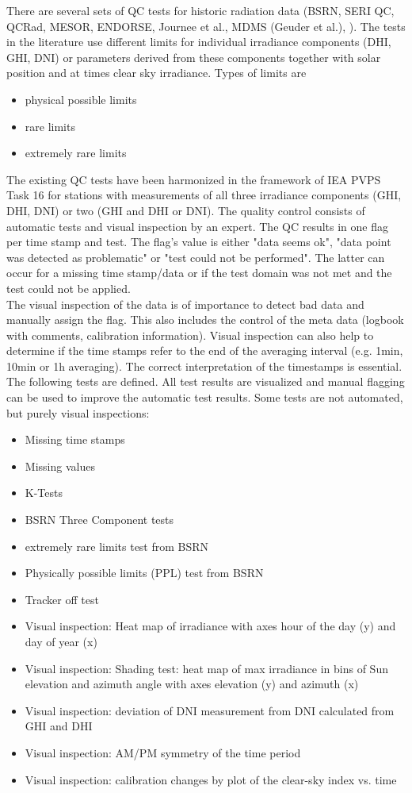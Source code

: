 There are several sets of QC tests for historic radiation data (BSRN, SERI QC, QCRad, MESOR, ENDORSE, Journee et al., MDMS (Geuder et al.), ).
The tests in the literature use different limits for individual irradiance components (DHI, GHI, DNI) or parameters derived from these components together with solar position and at times clear sky irradiance. Types of limits are 
\begin{itemize}
    \item physical possible limits
    \item rare limits
    \item extremely rare limits
\end{itemize}
The existing QC tests have been harmonized in the framework of IEA PVPS Task 16 for stations with measurements of all three irradiance components (GHI, DHI, DNI) or two (GHI and DHI or DNI).
The quality control consists of automatic tests and visual inspection by an expert. The  QC results in one flag per time stamp and test. The flag's value is either "data seems ok", "data point was detected as problematic" or "test could not be performed". The latter can occur for a missing time stamp/data or if the test domain was not met and the test could not be applied.\\
The visual inspection of the data is of importance to detect bad data and manually assign the flag. This also includes the control of the meta data (logbook with comments, calibration information). Visual inspection can also help to determine if the time stamps refer to the end of the averaging interval (e.g. 1min, 10min or 1h averaging). The correct interpretation of the timestamps is essential. 
The following tests are defined. All test results are visualized and manual flagging can be used to improve the automatic test results. Some tests are not automated, but purely visual inspections:
\begin{itemize}
    \item   Missing time stamps	
    \item	Missing values	
    \item	K-Tests	
    \item	BSRN Three Component tests	
    \item	extremely rare limits test from BSRN	
    \item	Physically possible limits (PPL) test from BSRN
    \item	Tracker off test
    \item	Visual inspection: Heat map of irradiance with axes hour of the day (y) and day of year	 (x)
    \item	Visual inspection: Shading test: heat map of max irradiance in bins of Sun elevation and azimuth angle	with axes elevation (y) and azimuth (x)
    \item   Visual inspection: deviation of DNI measurement from DNI calculated from GHI and DHI	
    \item	Visual inspection: AM/PM symmetry of the time period	
    \item	Visual inspection: calibration changes by plot of the clear-sky index vs. time	
\end{itemize}



